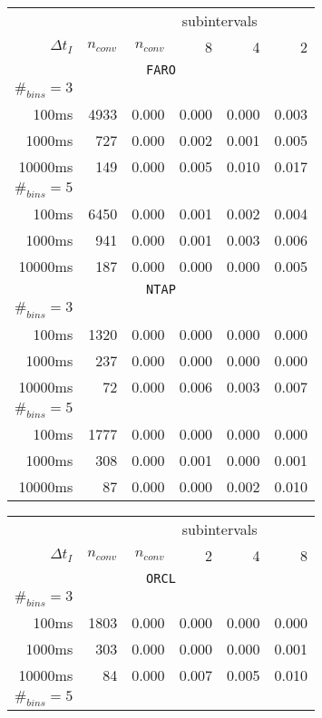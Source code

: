 \begin{table}[H]
\centering
{}
\begin{tabular}{@{}rrrrrr@{}}
\toprule
 &  & \multicolumn{4}{c}{subintervals} \\ 
\cmidrule{3-6}
$\Delta t_I$ & $n_{conv}$ & $n_{conv}$ & 8 & 4 & 2 \\
\midrule
\multicolumn{6}{c}{\texttt{FARO}} \\
$\#_{bins}=3$ &&&&& \\
100ms &  4933 & 0.000 & 0.000 & 0.000 & 0.003 \\
1000ms &  727 & 0.000 & 0.002 & 0.001 & 0.005 \\
10000ms & 149 & 0.000 & 0.005 & 0.010 & 0.017 \\
$\#_{bins}=5$ &&&&& \\
100ms &  6450 & 0.000 & 0.001 & 0.002 & 0.004 \\
1000ms &  941 & 0.000 & 0.001 & 0.003 & 0.006 \\
10000ms & 187 & 0.000 & 0.000 & 0.000 & 0.005 \\
\multicolumn{6}{c}{\texttt{NTAP}} \\
$\#_{bins}=3$ &&&&& \\
100ms & 1320 & 0.000 & 0.000 & 0.000 & 0.000 \\
1000ms & 237 & 0.000 & 0.000 & 0.000 & 0.000 \\
10000ms & 72 & 0.000 & 0.006 & 0.003 & 0.007 \\
$\#_{bins}=5$ &&&&& \\
100ms & 1777 & 0.000 & 0.000 & 0.000 & 0.000 \\
1000ms & 308 & 0.000 & 0.001 & 0.000 & 0.001 \\
10000ms & 87 & 0.000 & 0.000 & 0.002 & 0.010 \\
\bottomrule
\end{tabular} \hfill
\begin{tabular}{@{}rrrrrr@{}}
\toprule
 &  & \multicolumn{4}{c}{subintervals} \\ 
\cmidrule{3-6}
$\Delta t_I$ & $n_{conv}$ & $n_{conv}$ & 2 & 4 & 8 \\
\midrule
\multicolumn{6}{c}{\texttt{ORCL}} \\
$\#_{bins}=3$ &&&&& \\
100ms & 1803 & 0.000 & 0.000 & 0.000 & 0.000 \\
1000ms & 303 & 0.000 & 0.000 & 0.000 & 0.001 \\
10000ms & 84 & 0.000 & 0.007 & 0.005 & 0.010 \\
$\#_{bins}=5$ &&&&& \\

\end{tabular}
\end{table}
